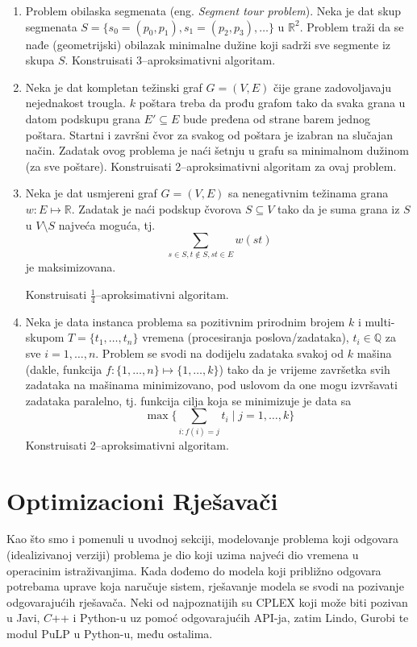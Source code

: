 \documentclass[a4paper, utf8, 11pt, colorlinks]{book}
\begin{document}
\begin{enumerate}
		 \item %
		 Problem obilaska segmenata (eng. \emph{Segment tour problem}). Neka je dat skup segmenata $S = \{s_0 = (p_0, p_1), s_1 =(p_2, p_3),\ldots\}$ u $\mathbb{R}^2$. Problem traži da se nađe (geometrijski) obilazak minimalne dužine koji sadrži sve segmente iz skupa $S$. Konstruisati 3--aproksimativni algoritam.  
		 \item Neka je dat kompletan težinski graf $G=(V,E)$ čije grane zadovoljavaju nejednakost trougla. $ k$ poštara treba da prođu grafom tako da svaka grana u datom podskupu grana $E' \subseteq E$ bude pređena  od strane barem jednog poštara. Startni i završni čvor za svakog od poštara je izabran na slučajan način. Zadatak ovog problema je naći šetnju u grafu sa minimalnom dužinom (za sve poštare). 
		 Konstruisati 2--aproksimativni algoritam za ovaj problem. 
		 \item %
		 Neka je dat usmjereni graf $G = (V,E) $ sa nenegativnim težinama grana $w:E\mapsto\mathbb{R}$. Zadatak je naći  podskup čvorova $S \subseteq V$ tako da je suma grana iz $S$ u $V\setminus S$ najveća moguća, tj. 
		  $$ \sum_{s \in S, t \notin S, st \in E }w(st)$$
		  je maksimizovana.  
		  
		  Konstruisati $\frac{1}{4}$--aproksimativni algoritam.
		 \item  %
		 Neka je data instanca problema sa pozitivnim prirodnim  brojem $k$ i multi-skupom 
		 $T = \{t_1,\ldots, t_n\}$ vremena (procesiranja poslova/zadataka), $t_i \in \mathbb{Q}$ za sve $i=1,\ldots, n$. 
		 Problem se svodi na dodijelu zadataka svakoj od $k$ mašina (dakle, funkcija $f:\{1,\ldots, n\} \mapsto \{1,\ldots, k\}$) tako da je vrijeme završetka svih zadataka na mašinama minimizovano, pod uslovom da one mogu izvršavati zadataka paralelno, tj. funkcija cilja koja se minimizuje je data sa 
		 $$\max \{\sum_{i: f(i) = j } t_i \mid j=1,\ldots, k \}$$
		 Konstruisati 2--aproksimativni algoritam.
\end{enumerate}



 \chapter{Optimizacioni Rješavači}
 
 Kao što smo i pomenuli u uvodnoj sekciji, modelovanje problema koji odgovara (idealizivanoj verziji) problema je 
 dio koji uzima najveći dio vremena u operacinim istraživanjima. Kada dođemo do modela koji približno odgovara potrebama uprave  
 koja naručuje sistem, rješavanje modela se svodi na pozivanje odgovarajućih rješavača. Neki od najpoznatijih su 
 CPLEX koji može biti pozivan u Javi, $C$++ i Python-u uz pomoć odgovarajućih API-ja, zatim Lindo, Gurobi te modul PuLP u Python-u, među ostalima.  
 
\end{document}
